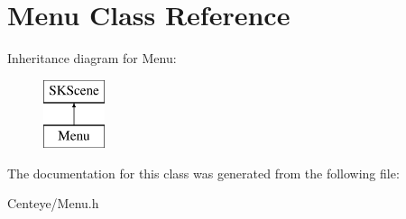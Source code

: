 \hypertarget{interface_menu}{\section{Menu Class Reference}
\label{interface_menu}
}
Inheritance diagram for Menu\+:\begin{figure}[H]
\begin{center}
\leavevmode
\includegraphics[height=2.000000cm]{interface_menu}
\end{center}
\end{figure}


The documentation for this class was generated from the following file\+:\begin{DoxyCompactItemize}
\item 
Centeye/Menu.\+h\end{DoxyCompactItemize}
